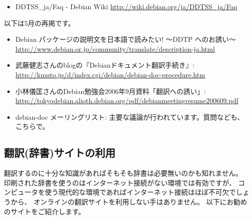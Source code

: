 \documentclass[mingoth,a4paper]{jsarticle}
\begin{document}
\begin{itemize}
 \item DDTSS\_ja/Faq - Debian Wiki
       \url{http://wiki.debian.org/ja/DDTSS_ja/Faq}
\end{itemize}

以下は5月の再掲です。
\begin{itemize}
 \item Debian パッケージの説明文を日本語で読みたい! 〜DDTP へのお誘い〜 
       \url{http://www.debian.or.jp/community/translate/description-ja.html}
 \item 武藤健志さんのblogの『Debianドキュメント翻訳手続き』:
       \url{http://kmuto.jp/d/index.cgi/debian/debian-doc-procedure.htm}
 \item 小林儀匡さんのDebian勉強会2006年9月資料「翻訳への誘い」:
       \url{http://tokyodebian.alioth.debian.org/pdf/debianmeetingresume200609.pdf}
 \item debian-doc メーリングリスト:
       主要な議論が行われています。質問なども、こちらで。
\end{itemize}

\subsection{翻訳(辞書)サイトの利用}
翻訳するのに十分な知識があればそもそも辞書は必要無いのかも知れません。
印刷された辞書を使うのはインターネット接続がない環境では有効ですが、
コンピュータを使う現代的な環境であればインターネット接続はほぼ不可欠でしょうから、
オンラインの翻訳サイトを利用しない手はありません。
以下にお勧めのサイトをご紹介します。
\end{document}
